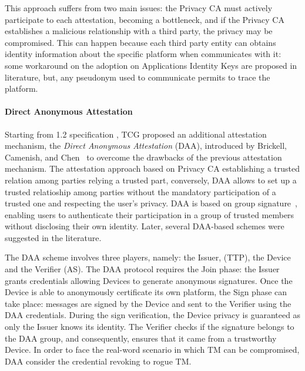 \documentclass[../tesi.tex]{subfiles}
\begin{document}
This approach suffers from two main issues: the Privacy CA must actively participate to each attestation, becoming a bottleneck, and if the Privacy CA establishes a malicious relationship with a third party, the \tpm{} privacy may be compromised. This can happen because each third party entity can obtains identity information about the specific platform when communicates with it: some workaround on the adoption on Applications Identity Keys are proposed in literature, but, any pseudonym used to communicate permits to trace the platform. 

\paragraph*{Direct Anonymous Attestation}
Starting from 1.2 specification \cite{sumrall2003trusted}, TCG proposed an additional attestation mechanism, the {\em Direct Anonymous Attestation} (DAA), introduced by Brickell, Camenish, and Chen~\cite{brickell2004direct} to overcome the drawbacks of the previous attestation mechanism. The attestation approach based on Privacy CA establishing a trusted relation among parties relying a trusted part, conversely, DAA allows to set up a trusted relatioship among parties without the mandatory participation of a trusted one and respecting the user's privacy. 
DAA is based on group signature~\cite{chaum1991group}, enabling users to authenticate their participation in a group of trusted members without disclosing their own identity. Later, several DAA-based schemes were suggested in the literature. 

The DAA scheme involves three players, namely: the Issuer, (TTP), the Device and the Verifier (AS). The DAA protocol requires the Join phase: the Issuer grants credentials allowing
Devices to generate anonymous signatures. Once the Device is able to anonymously certificate its own platform, the Sign phase can take place: messages are signed by the Device and sent to the Verifier using the DAA credentials. During the sign verification, the Device privacy is guaranteed as only the Issuer knows its identity. The Verifier checks if the signature belongs to the DAA group, and consequently, ensures that it came from a trustworthy Device. In order to face the real-word scenario in which TM can be compromised, DAA consider the credential revoking to rogue TM.
\end{document}
